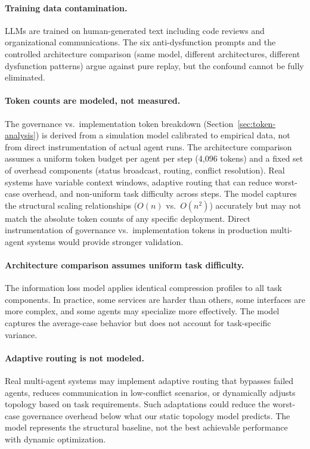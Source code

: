 \documentclass[11pt,a4paper]{article}
\begin{document}
\paragraph{Training data contamination.} LLMs are trained on human-generated text including code reviews and organizational communications. The six anti-dysfunction prompts and the controlled architecture comparison (same model, different architectures, different dysfunction patterns) argue against pure replay, but the confound cannot be fully eliminated.

\paragraph{Token counts are modeled, not measured.} The governance vs.\ implementation token breakdown (Section~\ref{sec:token-analysis}) is derived from a simulation model calibrated to empirical data, not from direct instrumentation of actual agent runs. The architecture comparison assumes a uniform token budget per agent per step (4,096 tokens) and a fixed set of overhead components (status broadcast, routing, conflict resolution). Real systems have variable context windows, adaptive routing that can reduce worst-case overhead, and non-uniform task difficulty across steps. The model captures the structural scaling relationships ($O(n)$ vs.\ $O(n^2)$) accurately but may not match the absolute token counts of any specific deployment. Direct instrumentation of governance vs.\ implementation tokens in production multi-agent systems would provide stronger validation.

\paragraph{Architecture comparison assumes uniform task difficulty.} The information loss model applies identical compression profiles to all task components. In practice, some services are harder than others, some interfaces are more complex, and some agents may specialize more effectively. The model captures the average-case behavior but does not account for task-specific variance.

\paragraph{Adaptive routing is not modeled.} Real multi-agent systems may implement adaptive routing that bypasses failed agents, reduces communication in low-conflict scenarios, or dynamically adjusts topology based on task requirements. Such adaptations could reduce the worst-case governance overhead below what our static topology model predicts. The model represents the structural baseline, not the best achievable performance with dynamic optimization.
\end{document}
